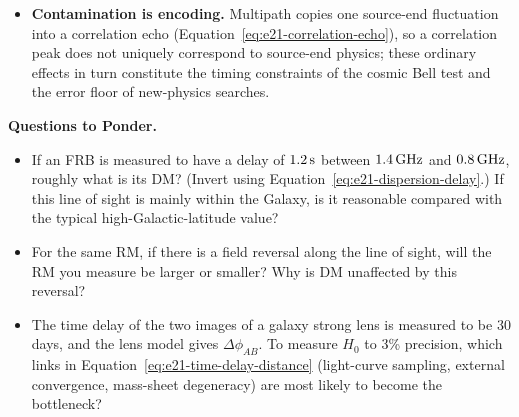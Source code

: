 \begin{itemize}
\item \textbf{Contamination is encoding.} Multipath copies one source-end fluctuation into a correlation echo (Equation~\eqref{eq:e21-correlation-echo}), so a correlation peak does not uniquely correspond to source-end physics; these ordinary effects in turn constitute the timing constraints of the cosmic Bell test and the error floor of new-physics searches.
\end{itemize}

\medskip
\noindent\textbf{Questions to Ponder.}
\begin{itemize}
\item If an FRB is measured to have a delay of \(1.2\,{\rm s}\) between \(1.4\,{\rm GHz}\) and \(0.8\,{\rm GHz}\), roughly what is its DM? (Invert using Equation~\eqref{eq:e21-dispersion-delay}.) If this line of sight is mainly within the Galaxy, is it reasonable compared with the typical high-Galactic-latitude value?
\item For the same RM, if there is a field reversal along the line of sight, will the RM you measure be larger or smaller? Why is DM unaffected by this reversal?
\item The time delay of the two images of a galaxy strong lens is measured to be \(30\) days, and the lens model gives \(\Delta\phi_{AB}\). To measure \(H_0\) to 3\% precision, which links in Equation~\eqref{eq:e21-time-delay-distance} (light-curve sampling, external convergence, mass-sheet degeneracy) are most likely to become the bottleneck?
\end{itemize}

